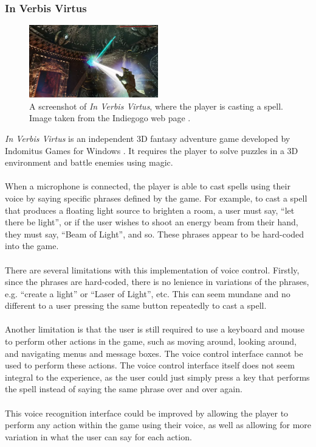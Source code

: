 \documentclass[11pt]{article}
\begin{document}
\subsubsection{In Verbis Virtus}

\begin{figure}
  \begin{center}
    \includegraphics[width=0.5\textwidth]{verbis-virtus.png}
  \end{center}
  \caption{A screenshot of \textit{In Verbis Virtus}, where the player is casting a spell. Image taken from the Indiegogo web page \cite{RefWorks:134}.}
\end{figure}

\textit{In Verbis Virtus} is an independent 3D fantasy adventure game developed by Indomitus Games for Windows \cite{RefWorks:22}. It requires the player to solve puzzles in a 3D environment and battle enemies using magic.
\\
\\
When a microphone is connected, the player is able to cast spells using their voice by saying specific phrases defined by the game. For example, to cast a spell that produces a floating light source to brighten a room, a user must say, ``let there be light'', or if the user wishes to shoot an energy beam from their hand, they must say, ``Beam of Light'', and so. These phrases appear to be hard-coded into the game.
\\
\\
There are several limitations with this implementation of voice control. Firstly, since the phrases are hard-coded, there is no lenience in variations of the phrases, e.g. ``create a light'' or ``Laser of Light'', etc. This can seem mundane and no different to a user pressing the same button repeatedly to cast a spell.
\\
\\
Another limitation is that the user is still required to use a keyboard and mouse to perform other actions in the game, such as moving around, looking around, and navigating menus and message boxes. The voice control interface cannot be used to perform these actions. The voice control interface itself does not seem integral to the experience, as the user could just simply press a key that performs the spell instead of saying the same phrase over and over again.
\\
\\
This voice recognition interface could be improved by allowing the player to perform any action within the game using their voice, as well as allowing for more variation in what the user can say for each action.
\end{document}
